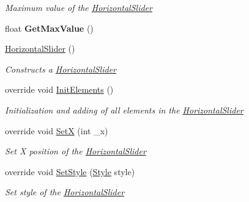 \begin{DoxyCompactItemize}
\begin{DoxyCompactList}\small\item\em Maximum value of the \mbox{\hyperlink{class_space_v_i_l_1_1_horizontal_slider}{Horizontal\+Slider}} \end{DoxyCompactList}\item 
\mbox{\label{class_space_v_i_l_1_1_horizontal_slider_a94e1abf73d109099bad642b521b965aa}} 
float {\bfseries Get\+Max\+Value} ()
\item 
\mbox{\hyperlink{class_space_v_i_l_1_1_horizontal_slider_ae040dcab9cc4d7c00b949b47adc0eeb5}{Horizontal\+Slider}} ()
\begin{DoxyCompactList}\small\item\em Constructs a \mbox{\hyperlink{class_space_v_i_l_1_1_horizontal_slider}{Horizontal\+Slider}} \end{DoxyCompactList}\item 
override void \mbox{\hyperlink{class_space_v_i_l_1_1_horizontal_slider_a6b0ab83eeb781a73e8196b744564cd3e}{Init\+Elements}} ()
\begin{DoxyCompactList}\small\item\em Initialization and adding of all elements in the \mbox{\hyperlink{class_space_v_i_l_1_1_horizontal_slider}{Horizontal\+Slider}} \end{DoxyCompactList}\item 
override void \mbox{\hyperlink{class_space_v_i_l_1_1_horizontal_slider_ab674da8d7310f5b68f9c85975073b076}{SetX}} (int \+\_\+x)
\begin{DoxyCompactList}\small\item\em Set X position of the \mbox{\hyperlink{class_space_v_i_l_1_1_horizontal_slider}{Horizontal\+Slider}} \end{DoxyCompactList}\item 
override void \mbox{\hyperlink{class_space_v_i_l_1_1_horizontal_slider_aa8a43a400a6fcab217d8af348071bc5f}{Set\+Style}} (\mbox{\hyperlink{class_space_v_i_l_1_1_decorations_1_1_style}{Style}} style)
\begin{DoxyCompactList}\small\item\em Set style of the \mbox{\hyperlink{class_space_v_i_l_1_1_horizontal_slider}{Horizontal\+Slider}} \end{DoxyCompactList}\end{DoxyCompactItemize}
